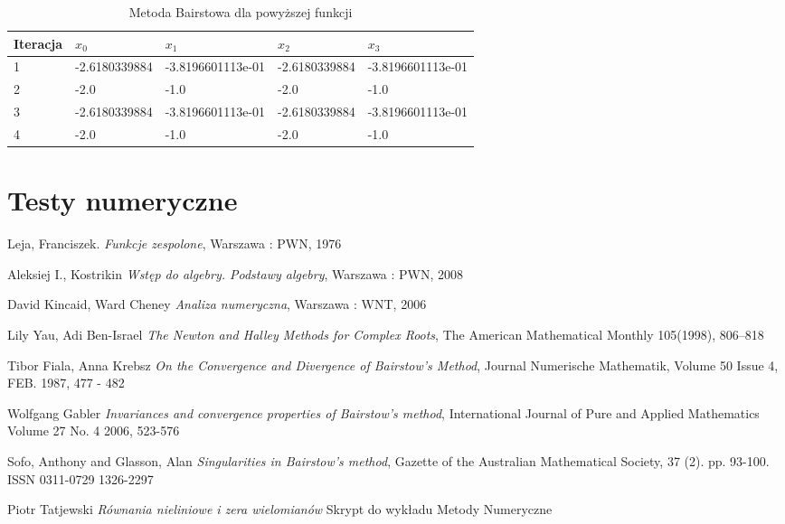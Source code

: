 \documentclass{article}
\begin{document}
\begin{table}[h!]
\centering
\caption{Metoda Bairstowa dla powyższej funkcji}
\label{my-label}
\begin{tabular}{|l|l|l|l|l|}
\hline
Iteracja & $x_0$           & $x_1$               & $x_2$           & $x_3$              \\ \hline
1        & -2.6180339884   & -3.8196601113e-01   & -2.6180339884   & -3.8196601113e-01   \\ \hline
2        & -2.0            & -1.0                & -2.0            & -1.0                \\ \hline
3        & -2.6180339884 & -3.8196601113e-01 & -2.6180339884 & -3.8196601113e-01 \\ \hline
4       & -2.0            & -1.0                & -2.0            & -1.0                \\ \hline

\end{tabular}
\end{table}


\section{Testy numeryczne}


\begin{thebibliography}{99}
 Leja, Franciszek.
\emph{Funkcje zespolone},
Warszawa : PWN, 1976

 Aleksiej I., Kostrikin
\emph{Wstęp do algebry. Podstawy algebry},
Warszawa : PWN, 2008

 David Kincaid, Ward Cheney
\emph{Analiza numeryczna},
Warszawa : WNT, 2006

Lily Yau, Adi Ben-Israel
\emph{The Newton and Halley Methods for Complex Roots},
The American Mathematical Monthly 105(1998), 806–818

Tibor Fiala, Anna Krebsz
\emph{On the Convergence and Divergence of Bairstow's Method},
Journal Numerische Mathematik, Volume 50 Issue 4, FEB. 1987, 477 - 482

Wolfgang Gabler
\emph{Invariances and convergence properties of Bairstow's method},
International Journal of Pure and Applied Mathematics Volume 27 No. 4 2006, 523-576

Sofo, Anthony and Glasson, Alan
\emph{Singularities in Bairstow’s method},
Gazette of the Australian Mathematical Society, 37 (2). pp. 93-100. ISSN 0311-0729 1326-2297

Piotr Tatjewski
\emph{Równania nieliniowe i zera wielomianów}
Skrypt do wykładu Metody Numeryczne

\end{thebibliography}
\end{document}
